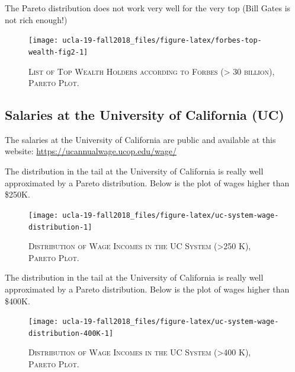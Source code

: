 \documentclass[]{book}
\theoremstyle{definition}
\theoremstyle{definition}
\theoremstyle{definition}
\theoremstyle{remark}
\begin{document}
The Pareto distribution does not work very well for the very top (Bill
Gates is not rich enough!)




\begin{figure}

{\centering \texttt{[image: ucla-19-fall2018\_files/figure-latex/forbes-top-wealth-fig2-1]} 

}

\caption{\textsc{List of Top Wealth Holders
according to Forbes (\textgreater{} 30 billion), Pareto Plot.}}\label{fig:forbes-top-wealth-fig2}
\end{figure}

\subsection{Salaries at the University of California
(UC)}\label{salaries-at-the-university-of-california-uc}

The salaries at the University of California are public and available at
this website: \url{https://ucannualwage.ucop.edu/wage/}

The distribution in the tail at the University of California is really
well approximated by a Pareto distribution. Below is the plot of wages
higher than \$250K.




\begin{figure}

{\centering \texttt{[image: ucla-19-fall2018\_files/figure-latex/uc-system-wage-distribution-1]} 

}

\caption{\textsc{Distribution of Wage Incomes
in the UC System (\textgreater{}250 K), Pareto Plot.}}\label{fig:uc-system-wage-distribution}
\end{figure}

The distribution in the tail at the University of California is really
well approximated by a Pareto distribution. Below is the plot of wages
higher than \$400K.




\begin{figure}

{\centering \texttt{[image: ucla-19-fall2018\_files/figure-latex/uc-system-wage-distribution-400K-1]} 

}

\caption{\textsc{Distribution of Wage
Incomes in the UC System (\textgreater{}400 K), Pareto Plot.}}\label{fig:uc-system-wage-distribution-400K}
\end{figure}
\end{document}
